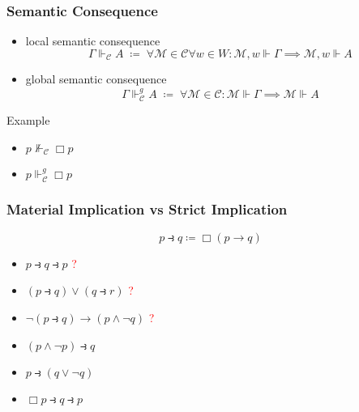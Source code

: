 \documentclass[UTF8,11pt,colorlinks,compress,openany]{beamer}%
\begin{document}
\begin{frame}\frametitle{Semantic Consequence}
	\begin{itemize}
		\item local semantic consequence
		\[\Gamma\Vdash_{\mathcal{C}} A\;\coloneqq \;\forall \mathcal{M}\in\mathcal{C}\forall w\in W:\mathcal{M},w\Vdash\Gamma\implies\mathcal{M},w\Vdash A\]
		\item global semantic consequence
		\[\Gamma\Vdash_{\mathcal{C}}^g A\;\coloneqq \;\forall \mathcal{M}\in\mathcal{C}: \mathcal{M}\Vdash\Gamma\implies\mathcal{M}\Vdash A\]
	\end{itemize}
	\begin{block}{Example}
		\begin{itemize}
			\item $p\nVdash_{\mathcal{C}}\Box p$
			\item $p\Vdash_{\mathcal{C}}^g\Box p$
		\end{itemize}
	\end{block}
\end{frame}

\begin{frame}\frametitle{Material Implication vs Strict Implication}
\[p\strictif q \coloneqq \Box(p\to q)\]
\begin{itemize}
	\item $p\strictif q\strictif p$ \textcolor{red}{?}
	\item $(p\strictif q)\vee(q\strictif r)$ \textcolor{red}{?}
	\item $\neg(p\strictif q)\to(p\wedge\neg q)$ \textcolor{red}{?}
	\item $(p\wedge\neg p)\strictif q$
	\item $p\strictif(q\vee\neg q)$
	\item $\Box p\strictif q\strictif p$
\end{itemize}
\end{frame}
\end{document}
